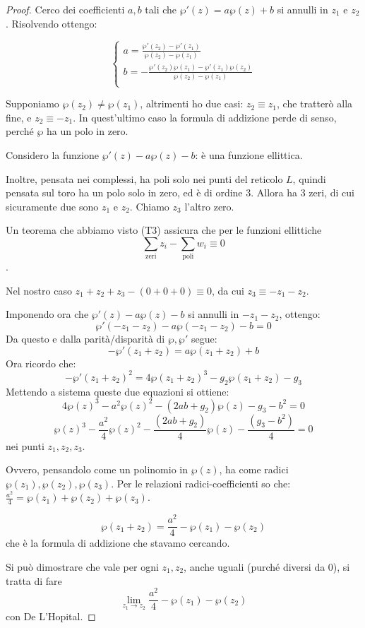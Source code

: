 \begin{proof}
Cerco dei coefficienti $a,b$ tali che $\wp'(z)=a\wp(z)+b$ si annulli in $z_1$ e $z_2$.
Risolvendo ottengo:

\begin{displaymath}
  \left\{
    \begin{array}{l}
      a = \frac{\wp'(z_2) - \wp'(z_1)}{\wp(z_2) - \wp(z_1)} \\
      b = - \frac{\wp'(z_2) \wp(z_1) - \wp'(z_1) \wp(z_2)}{\wp(z_2) - \wp(z_1)} \\
    \end{array}
  \right.
\end{displaymath}

Supponiamo $\wp(z_2) \neq \wp(z_1)$, altrimenti ho due casi: $z_2 \equiv z_1$, che tratterò alla fine, e $z_2 \equiv -z_1$.
In quest'ultimo caso la formula di addizione perde di senso, perché $\wp$ ha un polo in zero.


Considero la funzione $\wp'(z) - a \wp(z) - b$: è una funzione ellittica.

Inoltre, pensata nei complessi, ha poli solo nei punti del reticolo $L$, quindi pensata sul toro ha un polo solo in zero, ed è di ordine 3.
Allora ha 3 zeri, di cui sicuramente due sono $z_1$ e $z_2$. Chiamo $z_3$ l'altro zero.

Un teorema che abbiamo visto (T3) assicura che per le funzioni ellittiche $$ \sum_\text{zeri} z_i - \sum_\text{poli} w_i \equiv 0$$.

Nel nostro caso $z_1 + z_2 + z_3 - (0+0+0) \equiv 0$, da cui $z_3 \equiv - z_1 - z_2$.

Imponendo ora che $\wp'(z) - a \wp(z) - b$ si annulli in $ -z_1 - z_2 $, ottengo:
$$ \wp'(-z_1-z_2) - a \wp(-z_1-z_2) - b = 0 $$
Da questo e dalla parità/disparità di $ \wp, \wp' $ segue:
$$ - \wp'(z_1+z_2) = a \wp(z_1+z_2) + b $$
Ora ricordo che: $$ - \wp'(z_1+z_2)^2 = 4 \wp(z_1+z_2)^3 - g_2 \wp(z_1+z_2) - g_3 $$
Mettendo a sistema queste due equazioni si ottiene:
$$4 \wp(z)^3 -a^2 \wp(z)^2 - (2ab+g_2) \wp(z) - g_3 - b^2=0$$
$$\wp(z)^3 -\frac{a^2}{4} \wp(z)^2 - \frac{(2ab+g_2)}{4} \wp(z) - \frac{(g_3 - b^2)}{4}=0$$
nei punti $z_1, z_2, z_3$.

Ovvero, pensandolo come un polinomio in $\wp(z)$, ha come radici $\wp(z_1), \wp(z_2), \wp(z_3)$.
Per le relazioni radici-coefficienti so che: $\frac{a^2}{4} = \wp(z_1) + \wp(z_2) + \wp(z_3)$.

$$\wp(z_1+z_2) = \frac{a^2}{4} - \wp(z_1) - \wp(z_2)$$
che è la formula di addizione che stavamo cercando.


Si può dimostrare che vale per ogni $z_1, z_2$, anche uguali (purché diversi da $0$), si tratta di fare
$$ \lim_{z_1 \rightarrow z_2} \frac{a^2}{4} - \wp(z_1) - \wp(z_2)$$ con De L'Hopital. 
\end{proof}


